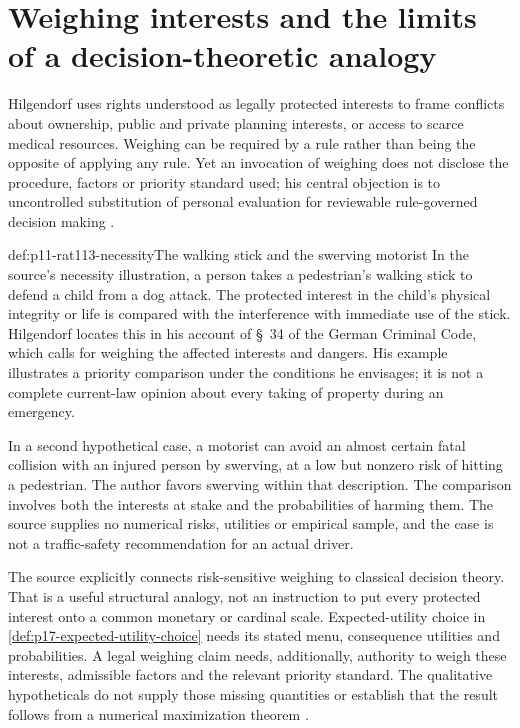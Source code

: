 \section{Weighing interests and the limits of a decision-theoretic analogy}
\label{sec:p11-rat113-weighing}

Hilgendorf uses rights understood as legally protected interests to frame
conflicts about ownership, public and private planning interests, or access
to scarce medical resources. Weighing can be required by a rule rather than
being the opposite of applying any rule. Yet an invocation of weighing does
not disclose the procedure, factors or priority standard used; his central
objection is to uncontrolled substitution of personal evaluation for
reviewable rule-governed decision making
\parencite[pp.~663--664]{Hilgendorf2021LegalLogic}.

\begin{hbexample}{def:p11-rat113-necessity}{The walking stick and the swerving motorist}
In the source's necessity illustration, a person takes a pedestrian's
walking stick to defend a child from a dog attack. The protected interest
in the child's physical integrity or life is compared with the interference
with immediate use of the stick. Hilgendorf locates this in his account of
\S~34 of the German Criminal Code, which calls for weighing the affected
interests and dangers. His example illustrates a priority comparison under
the conditions he envisages; it is not a complete current-law opinion about
every taking of property during an emergency.

In a second hypothetical case, a motorist can avoid an almost certain fatal
collision with an injured person by swerving, at a low but nonzero risk of
hitting a pedestrian. The author favors swerving within that description.
The comparison involves both the interests at stake and the probabilities
of harming them. The source supplies no numerical risks, utilities or
empirical sample, and the case is not a traffic-safety recommendation for
an actual driver.
\end{hbexample}

The source explicitly connects risk-sensitive weighing to classical
decision theory. That is a useful structural analogy, not an instruction
to put every protected interest onto a common monetary or cardinal scale.
Expected-utility choice in \cref{def:p17-expected-utility-choice} needs
its stated menu, consequence utilities and probabilities. A legal weighing
claim needs, additionally, authority to weigh these interests, admissible
factors and the relevant priority standard. The qualitative hypotheticals
do not supply those missing quantities or establish that the result follows
from a numerical maximization theorem
\parencite[p.~663, note~21 on p.~665]{Hilgendorf2021LegalLogic}.

